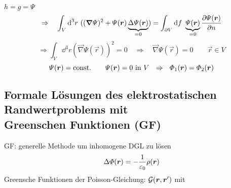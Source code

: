 $h = g = \varPsi$
$$\Rightarrow \quad \int_V \textrm{d}^3 r\ ((\bm{\nabla} \varPsi)^2 + \varPsi(\bm{r}) \underbrace{\Delta \varPsi(\bm{r})}_{=0}) = \int_{\partial V} \textrm{d} f\ \underbrace{\varPsi(\bm{r})}_{=0} \frac{\partial \varPsi(\bm{r})}{\partial n} $$
\begin{equation*}
\Rightarrow \int_V \dd^3 r \left(\vec{\nabla} \varPsi(\vec{r}) \right)^2 = 0 \quad \Rightarrow \quad \vec{\nabla} \varPsi(\vec{r}) = 0 \qquad \vec{r} \in V
\end{equation*}
\begin{equation*}
\varPsi(\bm{r}) = \textrm{const.} \qquad \varPsi(\bm{r}) = 0 \ \textrm{in} \ V \ \ \Rightarrow \ \ \varPhi_1(\bm{r}) = \varPhi_2(\bm{r})
\end{equation*}

\subsection{Formale Lösungen des elektrostatischen Randwertproblems mit \texorpdfstring{\\}{newline} Greenschen Funktionen (GF)}
GF: generelle Methode um inhomogene DGL zu lösen
\begin{equation*}
\Delta \varPhi(\bm{r}) = - \frac{1}{\varepsilon_0} \rho(\bm{r})
\end{equation*}
Greensche Funktionen der Poisson-Gleichung: $ \mathcal{G}(\bm{r},\bm{r}') $ mit
\noindent
{}

